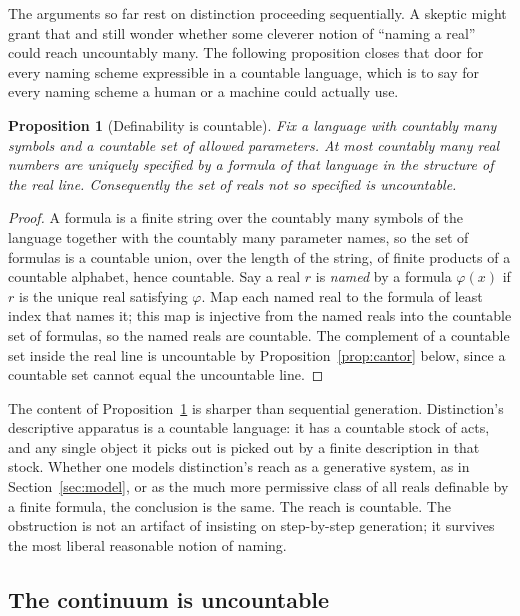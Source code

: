 \documentclass[11pt,a4paper]{article}
\newtheorem{proposition}[theorem]{Proposition}
\theoremstyle{definition}
\theoremstyle{remark}
\begin{document}
The arguments so far rest on distinction proceeding sequentially. A skeptic might
grant that and still wonder whether some cleverer notion of ``naming a real''
could reach uncountably many. The following proposition closes that door for
every naming scheme expressible in a countable language, which is to say for
every naming scheme a human or a machine could actually use.

\begin{proposition}[Definability is countable]\label{prop:defcount}
Fix a language with countably many symbols and a countable set of allowed
parameters. At most countably many real numbers are uniquely specified by a
formula of that language in the structure of the real line. Consequently the set
of reals not so specified is uncountable.
\end{proposition}

\begin{proof}
A formula is a finite string over the countably many symbols of the language
together with the countably many parameter names, so the set of formulas is a
countable union, over the length of the string, of finite products of a countable
alphabet, hence countable. Say a real $r$ is \emph{named} by a formula $\varphi(x)$
if $r$ is the unique real satisfying $\varphi$. Map each named real to the formula
of least index that names it; this map is injective from the named reals into the
countable set of formulas, so the named reals are countable. The complement of a
countable set inside the real line is uncountable by Proposition~\ref{prop:cantor}
below, since a countable set cannot equal the uncountable line.
\end{proof}

The content of Proposition~\ref{prop:defcount} is sharper than sequential
generation. Distinction's descriptive apparatus is a countable language: it has a
countable stock of acts, and any single object it picks out is picked out by a
finite description in that stock. Whether one models distinction's reach as a
generative system, as in Section~\ref{sec:model}, or as the much more permissive
class of all reals definable by a finite formula, the conclusion is the same. The
reach is countable. The obstruction is not an artifact of insisting on
step-by-step generation; it survives the most liberal reasonable notion of
naming.

\subsection{The continuum is uncountable}
\end{document}
